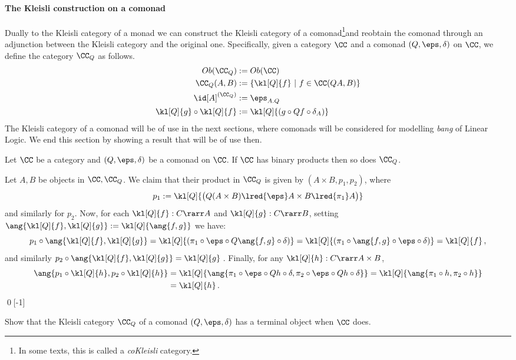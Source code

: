 \documentclass[12pt]{article}
\begin{document}
\paragraph{The Kleisli construction on a comonad}
Dually to the Kleisli category of a monad we can construct the Kleisli category of a comonad\footnote{In some texts, this is called a \emph{coKleisli}
category.}\HY and reobtain the comonad through an adjunction between the Kleisli category and the original one. Specifically, given a category $\CC$
and a comonad $(Q,\eps,\delta)$ on $\CC$, we define the category $\CC_Q$ as follows.
\begin{align*}
Ob(\CC_Q) &:= Ob(\CC) \\
\CC_Q(A,B)&:= \{ \kl[Q]{f}\ |\ f\in\CC(QA,B) \} \\
\id[A]^{(\CC_Q)} &:= \eps_{A.Q} \\
\kl[Q]{g}\circ\kl[Q]{f} &:= \kl[Q]{(g\circ Qf\circ\delta_A)}
\end{align*}
%
The Kleisli category of a comonad will be of use in the next sections, where comonads will be considered for modelling \emph{bang} of Linear Logic. We
end this section by showing a result that will be of use then.
%
\begin{myproposition}\label{p:Qprods}
Let $\CC$ be a category and $(Q,\eps,\delta)$ be a comonad on $\CC$. If $\CC$ has binary products then so does $\CC_Q$.
\end{myproposition}
\proof%
Let $A,B$ be objects in $\CC,\CC_Q$. We claim that their product in $\CC_Q$ is given by $(A\times B,p_1,p_2)$, where
\[ p_1:=\kl[Q]{\big(Q(A\times B)\lred{\eps}A\times B\lred{\pi_1}A\big)} \]
and similarly for $p_2$. Now, for each $\kl[Q]{f}:C\rarr A$ and $\kl[Q]{g}:C\rarr B$, setting $\ang{\kl[Q]{f},\kl[Q]{g}}:=\kl[Q]{\ang{f,g}}$ we have:
\[
 p_1\circ\ang{\kl[Q]{f},\kl[Q]{g}} = \kl[Q]{(\pi_1\circ\eps\circ Q\ang{f,g}\circ\delta)} = \kl[Q]{(\pi_1\circ
 \ang{f,g}\circ\eps\circ\delta)}=\kl[Q]{f}\,,
\]
and similarly $p_2\circ\ang{\kl[Q]{f},\kl[Q]{g}} =\kl[Q]{g}$\,. Finally, for any $\kl[Q]{h}:C\rarr A\times B$,
\begin{align*}
 \ang{p_1\circ\kl[Q]{h},p_2\circ\kl[Q]{h}} &= \kl[Q]{\ang{\pi_1\circ\eps\circ Qh\circ\delta,\pi_2\circ\eps\circ Qh\circ\delta}}
    = \kl[Q]{\ang{\pi_1\circ h,\pi_2\circ h}}\\ &= \kl[Q]{h}\,.
\end{align*}
\qed[-1]

\begin{myexercise}\label{e:Qterms}
Show that the Kleisli category $\CC_Q$ of a comonad $(Q,\eps,\delta)$ has a terminal object when $\CC$ does.
\end{myexercise}
%
\end{document}
